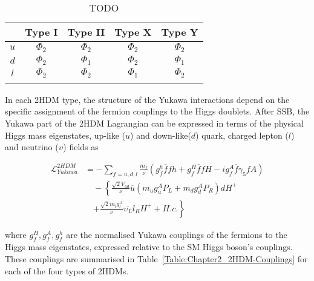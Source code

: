 \begin{table}[h]
\centering
\renewcommand{\arraystretch}{1.5} %
\setlength{\tabcolsep}{12pt} %
\begin{tabular}{|c|c|c|c|c|}
\hline
    & Type I   & Type II  & Type X   & Type Y   \\ \hline \hline
$u$ & $\Phi_2$ & $\Phi_2$ & $\Phi_2$ & $\Phi_2$ \\ 
\arrayrulecolor{lightgray} \hline
$d$ & $\Phi_2$ & $\Phi_1$ & $\Phi_2$ & $\Phi_1$ \\ 
\arrayrulecolor{lightgray} \hline
$l$ & $\Phi_2$ & $\Phi_2$ & $\Phi_1$ & $\Phi_2$ \\ 
\arrayrulecolor{black} \hline
\end{tabular}
\caption{TODO}
\label{Table:Chapter2_2HDM-Types}
\end{table}

In each 2HDM type, the structure of the Yukawa interactions depend on the specific assignment of the fermion couplings to the Higgs doublets. After SSB, the Yukawa part of the 2HDM Lagrangian can be expressed in terms of the physical Higgs mass eigenstates, up-like ($u$) and down-like($d$) quark, charged lepton ($l$) and neutrino ($\upsilon$) fields as

\begin{equation}
\begin{aligned}
    \mathcal{L}_{Yukawa}^{2HDM} &= - \sum\limits_{f=u,d,l} \frac{m_f}{\nu} 
    \left(g_f^h \overline{f}f h + g_f^H\overline{f}f H - i g_f^A\overline{f} \gamma_5 f A \right) \\
    &\quad - \left\{ \frac{\sqrt{2}V_{ud}}{\nu} \overline{u} 
    \left(m_u g_u^A P_L + m_d g_d^A P_R \right) d H^+ \right. \\
    &\quad \left. + \frac{\sqrt{2}m_l g_{l}^A}{\nu} \overline{\upsilon
_L} l_R H^+ + H.c. \right\}
\end{aligned}
\label{Equation:Chapter2_2HDM-YukawaLagrangian}
\end{equation}

where $g_f^H,g_f^A,g_f^h$ are the normalised Yukawa couplings of the fermions to the Higgs mass eigenstates, expressed relative to the SM Higgs boson's couplings. These couplings are summarised in Table~\ref{Table:Chapter2_2HDM-Couplings} for each of the four types of 2HDMs.


